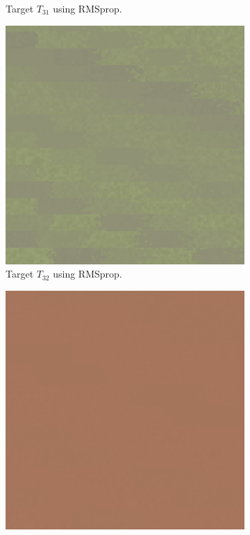\begin{figure}
\begin{subfigure}[t]{.25\textwidth}
    \caption{Target $T_{31}$ using RMSprop.}
    \label{fig:M3MSEFinalRendersTwoParamRMSprop}
\end{subfigure}\hspace{0.7cm}
\begin{subfigure}[t]{.25\textwidth}
    \centering
    \includegraphics[width=\linewidth]{img/evaluation/M3/random/MSE_RMSprop_random_final.png}
    \caption{Target $T_{32}$ using RMSprop.}
    \label{fig:M3MSEFinalRendersRandomRMSprop}
\end{subfigure}\hspace{0.7cm}
\begin{subfigure}[t]{.25\textwidth}
    \centering
    \includegraphics[width=\linewidth]{img/evaluation/M3/real life/MSE_RMSprop_real_life_final.png}

\end{subfigure}
\end{figure}
